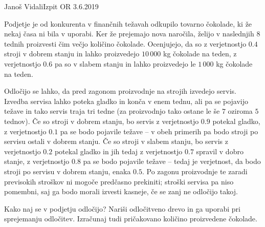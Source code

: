 \begin{naloga}{Janoš Vidali}{Izpit OR 3.6.2019}
\begin{vprasanje}
Podjetje je od konkurenta v finančnih težavah odkupilo tovarno čokolade,
ki že nekaj časa ni bila v uporabi.
Ker že prejemajo nova naročila,
želijo v naslednjih $8$ tednih proizvesti čim večjo količino čokolade.
Ocenjujejo, da so z verjetnostjo $0.4$ stroji v dobrem stanju
in lahko proizvedejo $10\,000$ kg čokolade na teden,
z verjetnostjo $0.6$ pa so v slabem stanju
in lahko proizvedejo le $1\,000$ kg čokolade na teden.

Odločijo se lahko, da pred zagonom proizvodnje na strojih izvedejo servis.
Izvedba servisa lahko poteka gladko in konča v enem tednu,
ali pa se pojavijo težave in tako servis traja tri tedne
(za proizvodnjo tako ostane le še $7$ oziroma $5$ tednov).
Če so stroji v dobrem stanju, bo servis z verjetnostjo $0.9$ potekal gladko,
z verjetnostjo $0.1$ pa se bodo pojavile težave
-- v obeh primerih pa bodo stroji po servisu ostali v dobrem stanju.
Če so stroji v slabem stanju,
bo servis z verjetnostjo $0.2$ potekal gladko
in jih tedaj z verjetnostjo $0.7$ spravil v dobro stanje,
z verjetnostjo $0.8$ pa se bodo pojavile težave
-- tedaj je verjetnost,
da bodo stroji po servisu v dobrem stanju, enaka $0.5$.
Po zagonu proizvodnje te zaradi previsokih stroškov
ni mogoče predčasno prekiniti;
stroški servisa pa niso pomembni,
saj ga bodo morali izvesti kasneje, če se zanj ne odločijo takoj.

Kako naj se v podjetju odločijo?
Nariši odločitveno drevo in ga uporabi pri sprejemanju odločitev.
Izračunaj tudi pričakovano količino proizvedene čokolade.
\end{vprasanje}

\begin{odgovor}
\end{odgovor}
\end{naloga}
